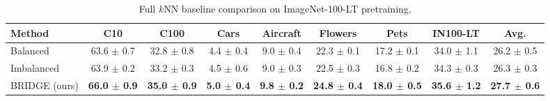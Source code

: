 \begin{table}[H]
\centering
\scriptsize
\setlength{\tabcolsep}{3.5pt}
\caption{Full $k$NN baseline comparison on ImageNet-100-LT pretraining.}
\label{tab:app_baselines_knn_full}
\begin{adjustbox}{width=\textwidth}
\begin{tabular}{l c c c c c c c c}
\toprule
Method & C10 & C100 & Cars & Aircraft & Flowers & Pets & IN100-LT & Avg. \\
\midrule
Balanced & 63.6 {\scriptsize$\pm$ 0.7} & 32.8 {\scriptsize$\pm$ 0.8} & 4.4 {\scriptsize$\pm$ 0.4} & 9.0 {\scriptsize$\pm$ 0.4} & 22.3 {\scriptsize$\pm$ 0.1} & 17.2 {\scriptsize$\pm$ 0.1} & 34.0 {\scriptsize$\pm$ 1.1} & 26.2 {\scriptsize$\pm$ 0.5} \\
Imbalanced & 63.9 {\scriptsize$\pm$ 0.2} & 33.2 {\scriptsize$\pm$ 0.3} & 4.5 {\scriptsize$\pm$ 0.6} & 9.0 {\scriptsize$\pm$ 0.3} & 22.5 {\scriptsize$\pm$ 0.3} & 16.8 {\scriptsize$\pm$ 0.2} & 34.3 {\scriptsize$\pm$ 0.3} & 26.3 {\scriptsize$\pm$ 0.3} \\
BRIDGE (ours) & \textbf{66.0 {\scriptsize$\pm$ 0.9}} & \textbf{35.0 {\scriptsize$\pm$ 0.9}} & \textbf{5.0 {\scriptsize$\pm$ 0.4}} & \textbf{9.8 {\scriptsize$\pm$ 0.2}} & \textbf{24.8 {\scriptsize$\pm$ 0.4}} & \textbf{18.0 {\scriptsize$\pm$ 0.5}} & \textbf{35.6 {\scriptsize$\pm$ 1.2}} & \textbf{27.7 {\scriptsize$\pm$ 0.6}} \\
\bottomrule
\end{tabular}
\end{adjustbox}
\end{table}
